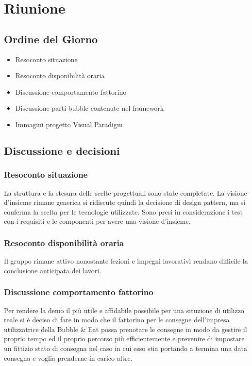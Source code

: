 \section{Riunione}
\subsection{Ordine del Giorno}
\begin{itemize}
	\item Resoconto situazione
	\item Resoconto disponibilità oraria
	\item Discussione comportamento fattorino
	\item Discussione parti bubble contenute nel framework 
	\item Immagini progetto Visual Paradigm
\end{itemize}

\subsection{Discussione e decisioni}

\subsubsection{Resoconto situazione}
La struttura e la stesura delle scelte progettuali sono state completate. La visione d'insieme rimane generica si ridiscute quindi la decisione di design pattern, ma si conferma la scelta per le tecnologie utilizzate. Sono presi in considerazione i test con i requisiti e le componenti per avere una visione d'insieme.

\subsubsection{Resoconto disponibilità oraria}
Il gruppo rimane attivo nonostante lezioni e impegni lavorativi rendano difficile la conclusione anticipata dei lavori.

\subsubsection{Discussione comportamento fattorino}
Per rendere la demo il più utile e affidabile possibile per una situzione di utilizzo reale si è deciso di fare in modo che il fattorino per le consegne dell'impresa utilizzatrice della Bubble \& Eat possa prenotare le consegne in modo da gestire il proprio tempo ed il proprio percorso più efficientemente e prevenire di impostare un fittizio stato di consegna nel caso in cui esso stia portando a termina una data consegna e voglia prenderne in carico altre. 

